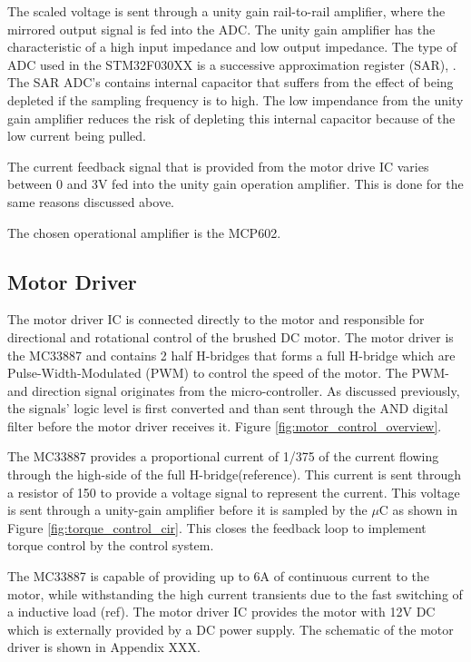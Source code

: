 \documentclass[a4paper,12pt]{article}
\begin{document}
	The scaled voltage is sent through a unity gain rail-to-rail amplifier, where the mirrored output signal is fed into the ADC. The unity gain amplifier has the characteristic of a high input impedance and low output impedance. The type of ADC used in the STM32F030XX is a successive approximation register (SAR), \cite{stm32_ADC:2017}. The SAR ADC's contains internal capacitor that suffers from the effect of being depleted if the sampling frequency is to high. The low impendance from the unity gain amplifier reduces the risk of depleting this internal capacitor because of the low current being pulled.
	
	The current feedback signal that is provided from the motor drive IC varies between 0 and 3V fed into the unity gain operation amplifier. This is done for the same reasons discussed above.
	
	The chosen operational amplifier is the MCP602. 
	
	\subsection{Motor Driver}
	
	The motor driver IC is connected directly to the motor and responsible for directional and rotational control of the brushed DC motor. The motor driver is the MC33887 and contains 2 half H-bridges that forms a full H-bridge which are Pulse-Width-Modulated (PWM) to control the speed of the motor. The PWM- and direction signal originates from the micro-controller. As discussed previously, the signals' logic level is first converted and than sent through the AND digital filter before the motor driver receives it. Figure \ref{fig:motor_control_overview}.
	
	The MC33887 provides a proportional current of 1/375 of the current flowing through the high-side of the full H-bridge(reference). This current is sent through a resistor of \SI{150}{\Omega} to provide a voltage signal to represent the current. This voltage is sent through a unity-gain amplifier before it is sampled by the $\mu$C as shown in Figure \ref{fig:torque_control_cir}. This closes the feedback loop to implement torque control by the control system.
	
	The MC33887 is capable of providing up to 6A of continuous current to the motor, while withstanding the high current transients due to the fast switching of a inductive load (ref). The motor driver IC provides the motor with 12V DC which is externally provided by a DC power supply. The schematic of the motor driver is shown in Appendix XXX.
	
\end{document}
